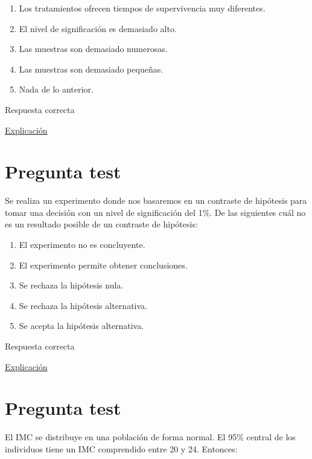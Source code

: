 \documentclass[
]{book}
\providecommand{\tightlist}{%
  \setlength{\itemsep}{0pt}\setlength{\parskip}{0pt}}
\begin{document}
\begin{enumerate}
\def\labelenumi{\alph{enumi})}
\tightlist
\item
  Los tratamientos ofrecen tiempos de supervivencia muy diferentes.
\item
  El nivel de significación es demasiado alto.
\item
  Las muestras son demasiado numerosas.
\item
  Las muestras son demasiado pequeñas.
\item
  Nada de lo anterior.
\end{enumerate}

Respuesta correcta

\href{https://1fjmanzano.github.io/bioestadistica/contrastes-de-hipo\%CC\%81tesis.html}{Explicación}

\hypertarget{pregunta-test-111}{%
\section{Pregunta test}\label{pregunta-test-111}}

Se realiza un experimento donde nos basaremos en un contraste de hipótesis para tomar una decisión con un nivel de significación del 1\%. De las siguientes cuál no es un resultado posible de un contraste de hipótesis:

\begin{enumerate}
\def\labelenumi{\alph{enumi})}
\tightlist
\item
  El experimento no es concluyente.
\item
  El experimento permite obtener conclusiones.
\item
  Se rechaza la hipótesis nula.
\item
  Se rechaza la hipótesis alternativa.
\item
  Se acepta la hipótesis alternativa.
\end{enumerate}

Respuesta correcta

\href{https://1fjmanzano.github.io/bioestadistica/contrastes-de-hipo\%CC\%81tesis.html}{Explicación}

\hypertarget{pregunta-test-112}{%
\section{Pregunta test}\label{pregunta-test-112}}

El IMC se distribuye en una población de forma normal. El 95\% central de los individuos tiene un IMC comprendido entre 20 y 24. Entonces:
\end{document}
